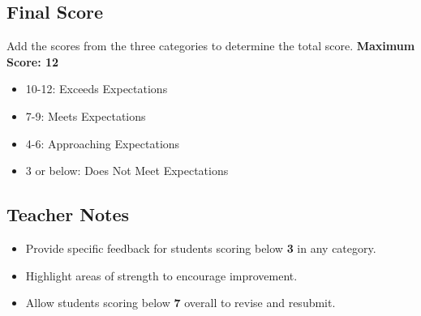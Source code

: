 \documentclass[12pt]{article}
\begin{document}
\subsection*{Final Score}
\begin{tcolorbox}[colframe=black!60, colback=white, title=Total Score Calculation]
Add the scores from the three categories to determine the total score. \textbf{Maximum Score: 12}
\begin{itemize}
    \item 10-12: Exceeds Expectations
    \item 7-9: Meets Expectations
    \item 4-6: Approaching Expectations
    \item 3 or below: Does Not Meet Expectations
\end{itemize}
\end{tcolorbox}

\subsection*{Teacher Notes}
\begin{itemize}
    \item Provide specific feedback for students scoring below \textbf{3} in any category.
    \item Highlight areas of strength to encourage improvement.
    \item Allow students scoring below \textbf{7} overall to revise and resubmit.
\end{itemize}
\end{document}
